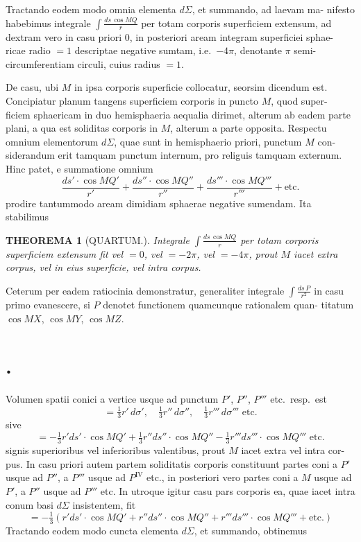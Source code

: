\documentclass[12pt,a4paper]{article}
\theoremstyle{gauss}
\newtheorem*{theorema}{THEOREMA}
\begin{document}
\newpage
\setcounter{page}{17}

Tractando eodem modo omnia elementa $d\Sigma$, et summando, ad laevam ma-
nifesto habebimus integrale $\int\frac{ds\,\cos MQ}{r}$ per totam corporis superficiem extensum,
ad dextram vero in casu priori $0$, in posteriori aream integram superficiei sphae-
ricae radio $=1$ descriptae negative sumtam, i.e.~$-4\pi$, denotante $\pi$ semi-
circumferentiam circuli, cuius radius $=1$.

De casu, ubi $M$ in ipsa corporis superficie collocatur, seorsim dicendum
est. Concipiatur planum tangens superficiem corporis in puncto $M$, quod super-
ficiem sphaericam in duo hemisphaeria aequalia dirimet, alterum ab eadem parte
plani, a qua est soliditas corporis in $M$, alterum a parte opposita. Respectu
omnium elementorum $d\Sigma$, quae sunt in hemisphaerio priori, punctum $M$ con-
siderandum erit tamquam punctum internum, pro religuis tamquam externum.
Hinc patet, e summatione omnium
\[
\frac{ds'\cdot\cos MQ'}{r'} + \frac{ds''\cdot\cos MQ''}{r''} + \frac{ds'''\cdot\cos MQ'''}{r'''} + \text{etc.}
\]
prodire tantummodo aream dimidiam sphaerae negative sumendam. Ita stabilimus

\begin{theorema}[QUARTUM.]
Integrale $\int\frac{ds\,\cos MQ}{r}$ per totam corporis superficiem extensum fit vel $=0$,
vel $=-2\pi$, vel $=-4\pi$, prout $M$ iacet extra corpus, vel in eius superficie, vel
intra corpus.
\end{theorema}

Ceterum per eadem ratiocinia demonstratur, generaliter integrale $\int\frac{ds\,P}{r^2}$
in casu primo evanescere, si $P$ denotet functionem quamcunque rationalem quan-
titatum $\cos MX$, $\cos MY$, $\cos MZ$.

\section*{%
%
\thesection.}

Volumen spatii conici a vertice usque ad punctum $P'$, $P''$, $P'''$ etc.~resp.~est
\[
= \tfrac{1}{3}r'\,d\sigma',\quad \tfrac{1}{3}r''\,d\sigma'',\quad \tfrac{1}{3}r'''\,d\sigma''' \text{ etc.}
\]
sive
\[
= -\tfrac{1}{3}r'ds'\cdot\cos MQ' + \tfrac{1}{3}r''ds''\cdot\cos MQ'' - \tfrac{1}{3}r'''ds'''\cdot\cos MQ''' \text{ etc.}
\]
signis superioribus vel inferioribus valentibus, prout $M$ iacet extra vel intra cor-
pus. In casu priori autem partem soliditatis corporis constituunt partes coni a
$P'$ usque ad $P''$, a $P'''$ usque ad $P^{\mathrm{IV}}$ etc., in posteriori vero partes coni a $M$
usque ad $P'$, a $P''$ usque ad $P'''$ etc. In utroque igitur casu pars corporis ea,
quae iacet intra conum basi $d\Sigma$ insistentem, fit
\[
= -\tfrac{1}{3}(r'ds'\cdot\cos MQ' + r''ds''\cdot\cos MQ'' + r'''ds'''\cdot\cos MQ''' + \text{etc.})
\]
Tractando eodem modo cuncta elementa $d\Sigma$, et summando, obtinemus
\end{document}
